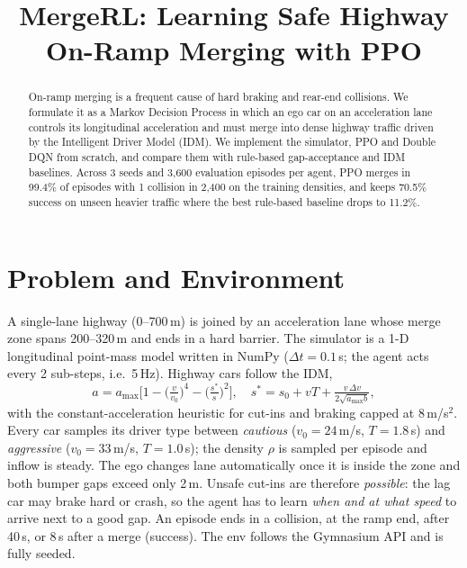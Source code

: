 \documentclass[conference,10pt]{IEEEtran}
\begin{document}
\title{MergeRL: Learning Safe Highway\\On-Ramp Merging with PPO}

\author{
}

\maketitle

\begin{abstract}
On-ramp merging is a frequent cause of hard braking and rear-end collisions.
We formulate it as a Markov Decision Process in which an ego car on an
acceleration lane controls its longitudinal acceleration and must merge into
dense highway traffic driven by the Intelligent Driver Model (IDM). We
implement the simulator, PPO and Double DQN from scratch, and compare them with
rule-based gap-acceptance and IDM baselines. Across 3 seeds and
3{,}600 evaluation episodes per agent, PPO merges in 99.4\% of episodes with
1 collision in 2{,}400 on the training densities, and keeps 70.5\% success on unseen
heavier traffic where the best rule-based baseline drops to 11.2\%.
\end{abstract}

\section{Problem and Environment}
A single-lane highway (0--700\,m) is joined by an acceleration lane whose merge
zone spans 200--320\,m and ends in a hard barrier. The simulator is a 1-D
longitudinal point-mass model written in NumPy ($\Delta t=0.1$\,s; the agent
acts every 2 sub-steps, i.e.\ 5\,Hz). Highway cars follow the IDM,
\begin{equation*}
a = a_{\max}\Big[1-\big(\tfrac{v}{v_0}\big)^4-\big(\tfrac{s^*}{s}\big)^2\Big],\quad
s^* = s_0+vT+\tfrac{v\,\Delta v}{2\sqrt{a_{\max} b}},
\end{equation*}
with the constant-acceleration heuristic for cut-ins and braking capped at
8\,m/s$^2$. Every car samples its driver type between \emph{cautious}
($v_0{=}24$\,m/s, $T{=}1.8$\,s) and \emph{aggressive} ($v_0{=}33$\,m/s,
$T{=}1.0$\,s); the density $\rho$ is sampled per episode and inflow is
steady. The ego changes lane automatically once it is inside the zone and both
bumper gaps exceed only 2\,m. Unsafe cut-ins are therefore \emph{possible}: the
lag car may brake hard or crash, so the agent has to learn \emph{when and at
what speed} to arrive next to a good gap. An episode ends in a collision,
at the ramp end, after 40\,s, or 8\,s after a merge (success). The env
follows the Gymnasium API and is fully seeded.
\end{document}
